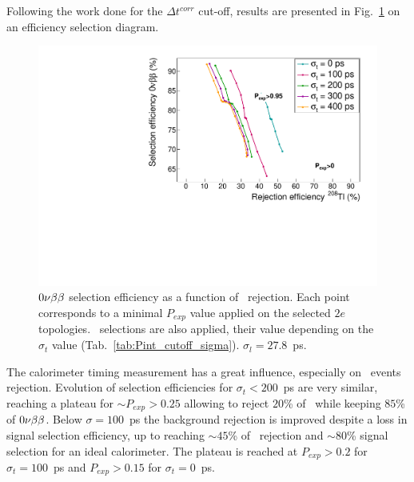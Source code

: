 Following the work done for the $\Delta t^{corr}$ cut-off, results are presented in Fig.~\ref{fig:eff_cut_proba_sigma} on an efficiency selection diagram.
\begin{figure}[!h]
  \centering
  \includegraphics[width=13cm]{timedifference/fig_timediff/compare_sigma_cut_proba.pdf}
  \caption{$0\nu\beta\beta$ selection efficiency as a function of \Tl\ rejection.
    Each point corresponds to a minimal $P_{exp}$ value applied on the selected $2e$ topologies.
    \Pint\ selections are also applied, their value depending on the $\sigma_{t}$ value (Tab.~\ref{tab:Pint_cutoff_sigma}).
    $\sigma_{l}=27.8$~ps.
    \label{fig:eff_cut_proba_sigma}}
\end{figure}
The calorimeter timing measurement has a great influence, especially on \Tl\ events rejection.
Evolution of selection efficiencies for ${\sigma_{t}<200}$~ps are very similar, reaching a plateau for ${\sim P_{exp}>0.25}$ allowing to reject $20$\% of \Tl\ while keeping $85$\% of $0\nu\beta\beta$.
Below $\sigma=100$~ps the background rejection is improved despite a loss in signal selection efficiency, up to reaching $\sim45$\% of \Tl\ rejection and $\sim80$\% signal selection for an ideal calorimeter.
The plateau is reached at $P_{exp}>0.2$ for $\sigma_{t}=100$~ps and $P_{exp}>0.15$ for $\sigma_{t}=0$~ps.

